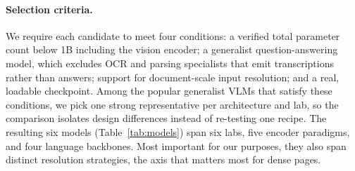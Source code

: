 \documentclass{article}
\begin{document}
\paragraph{Selection criteria.}
We require each candidate to meet four conditions: a verified total parameter
count below 1B including the vision encoder; a generalist question-answering
model, which excludes OCR and parsing specialists that emit transcriptions
rather than answers; support for document-scale input resolution; and a real,
loadable checkpoint. Among the popular generalist VLMs that satisfy these
conditions, we pick one strong representative per architecture and lab, so the
comparison isolates design differences instead of re-testing one recipe. The
resulting six models (Table~\ref{tab:models}) span six labs, five encoder
paradigms, and four language backbones. Most important for our purposes, they
also span distinct resolution strategies, the axis that matters most for dense
pages.

\begin{table}[t]
\caption{The six evaluated sub-1B VLMs. Parameter counts include the vision
encoder. Resolution strategy is the primary design axis under study.}
\label{tab:models}
\centering
{}
\end{table}
\end{document}
